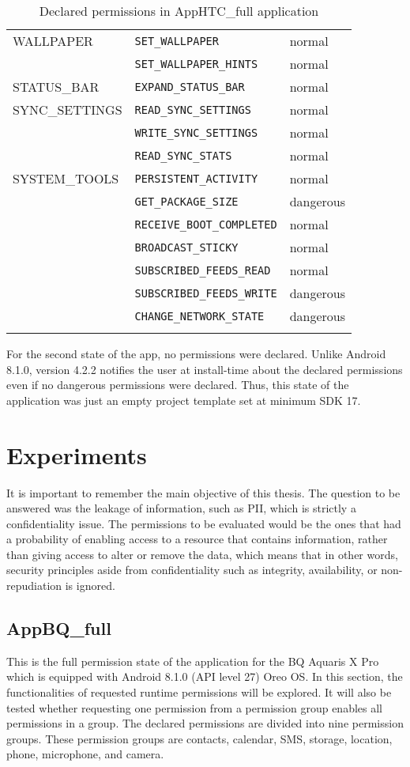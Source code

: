 \documentclass[
  a4paper,  %
  twoside,  %
  bibliography=totoc,
  headsepline,
  cleardoublepage=empty,
  parskip=half,
  draft=false,
  open=any
]{scrbook}
\begin{document}
\begin{longtable}{|p{5cm}|p{6cm}|p{1.7cm}|}
	\hline
	WALLPAPER & \texttt{SET\_WALLPAPER} & normal \\
	& \texttt{SET\_WALLPAPER\_HINTS} & normal \\
	\hline
	STATUS\_BAR & \texttt{EXPAND\_STATUS\_BAR} & normal \\
	\hline
	SYNC\_SETTINGS & \texttt{READ\_SYNC\_SETTINGS} & normal \\
	& \texttt{WRITE\_SYNC\_SETTINGS} & normal \\
	& \texttt{READ\_SYNC\_STATS} & normal \\
	\hline
	SYSTEM\_TOOLS & \texttt{PERSISTENT\_ACTIVITY} & normal \\ 
	& \texttt{GET\_PACKAGE\_SIZE} & dangerous \\	
	& \texttt{RECEIVE\_BOOT\_COMPLETED} & normal \\
	& \texttt{BROADCAST\_STICKY} & normal \\
	& \texttt{SUBSCRIBED\_FEEDS\_READ} & normal \\
	& \texttt{SUBSCRIBED\_FEEDS\_WRITE} & dangerous \\	
	& \texttt{CHANGE\_NETWORK\_STATE} & dangerous \\	
	\hline
	\caption{Declared permissions in AppHTC\_full application}
	\label{apphtcfperms}
\end{longtable}

For the second state of the app, no permissions were declared. Unlike Android 8.1.0, version 4.2.2 notifies the user at install-time about the declared permissions even if no dangerous permissions were declared. Thus, this state of the application was just an empty project template set at minimum SDK 17.

\chapter{Experiments}
\label{cha:experiments}

It is important to remember the main objective of this thesis. The question to be answered was the leakage of information, such as PII, which is strictly a confidentiality issue. The permissions to be evaluated would be the ones that had a probability of enabling access to a resource that contains information, rather than giving access to alter or remove the data, which means that in other words, security principles aside from confidentiality such as integrity, availability, or non-repudiation is ignored. 

\section{AppBQ\_full}
This is the full permission state of the application for the BQ Aquaris X Pro which is equipped with Android 8.1.0 (API level 27) Oreo OS. In this section, the functionalities of requested runtime permissions will be explored. It will also be tested whether requesting one permission from a permission group enables all permissions in a group. The declared permissions are divided into nine permission groups. These permission groups are contacts, calendar, SMS, storage, location, phone, microphone, and camera.
\end{document}
